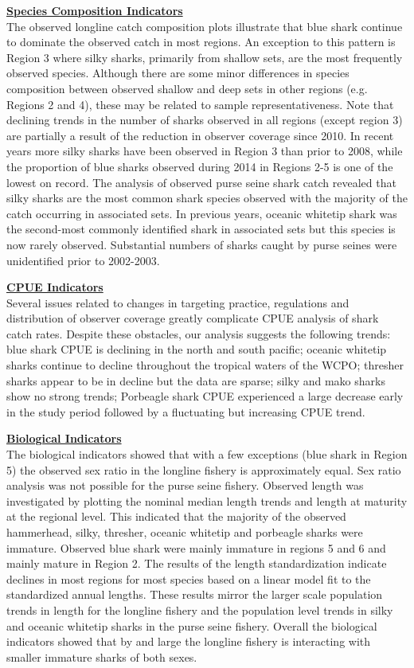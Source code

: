 \documentclass[12pt]{SCreport}
\begin{document}
\textbf{\underline{Species Composition Indicators}}\\
The observed longline catch composition plots illustrate that blue shark continue to dominate the observed catch in most regions. An exception to this pattern is Region 3 where silky sharks, primarily from shallow sets, are the most frequently observed species. Although there are some minor differences in species composition between observed shallow and deep sets in other regions (e.g. Regions 2 and 4), these may be related to sample representativeness. Note that declining trends in the number of sharks observed in all regions (except region 3) are partially a result of the reduction in observer coverage since 2010. In recent years more silky sharks have been observed in Region 3 than prior to 2008, while the proportion of blue sharks observed during 2014 in Regions 2-5 is one of the lowest on record. The analysis of observed purse seine shark catch revealed that silky sharks are the most common shark species observed with the majority of the catch occurring in associated sets. In previous years, oceanic whitetip shark was the second-most commonly identified shark in associated sets but this species is now rarely observed. Substantial numbers of sharks caught by purse seines were unidentified prior to 2002-2003.


\textbf{\underline{CPUE Indicators}}\\
Several issues related to changes in targeting practice, regulations and distribution of observer coverage greatly complicate CPUE analysis of shark catch rates.  Despite these obstacles, our analysis suggests the following trends: blue shark CPUE is declining in the north and south pacific; oceanic whitetip sharks continue to decline throughout the tropical waters of the WCPO; thresher sharks appear to be in decline but the data are sparse; silky and mako sharks show no strong trends; Porbeagle shark CPUE experienced a large decrease early in the study period followed by a fluctuating but increasing CPUE trend.


\textbf{\underline{Biological Indicators}}\\
The biological indicators showed that with a few exceptions (blue shark in Region 5) the observed sex ratio in the longline fishery is approximately equal. Sex ratio analysis was not possible for the purse seine fishery. Observed length was investigated by plotting the nominal median length trends and length at maturity at the regional level. This indicated that the majority of the observed hammerhead, silky, thresher, oceanic whitetip and porbeagle sharks were immature. Observed blue shark were mainly immature in regions 5 and 6 and mainly mature in Region 2. The results of the length standardization indicate declines in most regions for most species based on a linear model fit to the standardized annual lengths. These results mirror the larger scale population trends in length
for the longline fishery and the population level trends in silky and oceanic whitetip sharks in the purse seine fishery. Overall the biological indicators showed that by and large the longline fishery is interacting with smaller immature sharks of both sexes.
\end{document}
